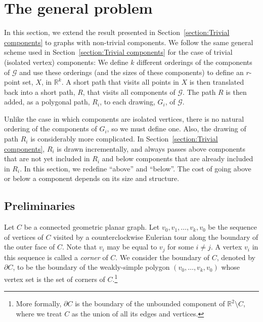 \documentclass{patmorin}
\newcommand{\R}{\mathbb{R}}
\begin{document}
\section{The general problem}\label{section:General}
In this section, we extend the result presented in
Section~\ref{section:Trivial components} to graphs with
non-trivial components.  We follow the same general scheme used in
Section~\ref{section:Trivial components} for the case of trivial
(isolated vertex) components:  We define $k$ different
orderings of the components of $\mathcal G$ and use these orderings (and
the sizes of these components) to define an $r$-point set, $X$, in $\R^k$. A
short path that visits all points in $X$ is then translated back into
a short path, $R$, that visits all components of $\mathcal G$. The path
$R$ is then
added, as a polygonal path, $R_i$, to each drawing, $G_i$, of $\mathcal G$.

Unlike the case in which
components are isolated vertices, there is no natural ordering of the
components of $G_i$, so we must define one. Also, the drawing
of path $R_i$ is considerably more complicated.  In Section~\ref{section:Trivial components}, $R_i$ is drawn incrementally, and always passes above components that are not yet included in $R_i$ and below components that are already included in $R_i$.  In this section, we redefine ``above'' and ``below''. The cost of going above or below a component depends on its size and structure.

\subsection{Preliminaries}\label{section:Preliminaries} 
Let $C$ be a connected geometric planar graph. Let $v_0, v_1, \ldots, v_k, v_0$ be the sequence of vertices of $C$ visited by a counterclockwise
Eulerian tour along the boundary of the outer face of $C$. Note that
$v_i$ may be equal to $v_j$ for some $i\neq j$.  A vertex $v_i$
in this sequence is called a \emph{corner} of $C$.  We consider the boundary of $C$, denoted by $\partial C$, to be the
boundary of the weakly-simple polygon $(v_0, \ldots, v_k, v_0)$ whose
vertex set is the set of corners of $C$.\footnote{More formally, $\partial C$ is the boundary of the unbounded component of $\mathbb{R}^2\setminus C$, where we treat $C$ as the union of all its edges and vertices.}
\end{document}
